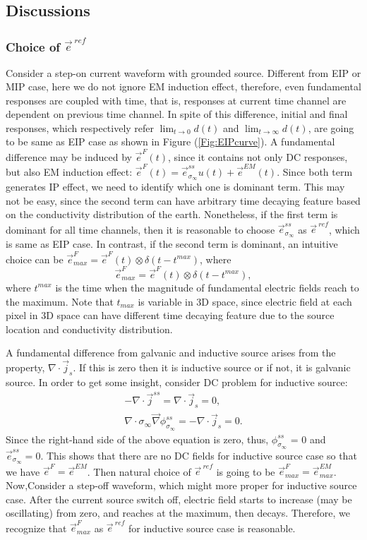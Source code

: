 \documentclass[a4paper, 11pt]{article}
\renewcommand{\div}{\nabla\cdot}
\newcommand{\grad}{\vec \nabla}
\newcommand{\siginf}{\sigma_\infty}
\renewcommand {\j}  { {\vec j} }
\newcommand {\e}  { {\vec e} }
\begin{document}
\subsection{Discussions}

\subsubsection{Choice of $\e^{\ ref}$}
Consider a step-on current waveform with grounded source. Different from EIP or MIP case, here we do not ignore EM induction effect, therefore, even fundamental responses are coupled with time, that is, responses at current time channel are dependent on previous time channel. In spite of this difference, initial and final responses, which respectively refer $\lim_{t\rightarrow 0}d (t)$ and $\lim_{t\rightarrow \infty}d (t)$, are going to be same as EIP case as shown in Figure (\ref{Fig:EIPcurve}). A fundamental difference may be induced by $\e^F(t)$, since it contains not only DC responses, but also EM induction effect: $\e^F(t) = \e^{ss}_{\siginf}u(t)+\e^{EM}(t)$. Since both term generates IP effect, we need to identify which one is dominant term. This may not be easy, since the second term can have arbitrary time decaying feature based on the conductivity distribution of the earth. Nonetheless, if the first term is dominant for all time channels, then it is reasonable to choose $\e^{ss}_{\siginf}$ as $\e^{\ ref}$, which is same as EIP case. In contrast, if the second term is dominant, an intuitive choice can be $\e^{F}_{max} = \e^{F}(t) \otimes \delta(t-t^{max})$, where
\begin{equation}
  \e^{F}_{max} = \e^{F}(t) \otimes \delta(t-t^{max}),
\end{equation}
where $t^{max}$ is the time when the magnitude of fundamental electric fields reach to the maximum. Note that $t_{max}$ is variable in 3D space, since electric field at each pixel in 3D space can have different time decaying feature due to the source location and conductivity distribution.

A fundamental difference from galvanic and inductive source arises from the property, $\div\j_s$.  If this is zero then it is inductive source or if not, it is galvanic source. In order to get some insight, consider DC problem for inductive source:
\begin{eqnarray*}
    -\div\j^{ss} = \div\j_s = 0, \\
    \div \siginf \grad \phi^{ss}_{\siginf} = -\div\j_s = 0.
\end{eqnarray*}
Since the right-hand side of the above equation is zero, thus, $\phi^{ss}_{\siginf}$ = 0 and $\e^{ss}_{\siginf}=0$. This shows that there are no DC fields for inductive source case so that we have $\e^{F} = \e^{EM}$. Then natural choice of $\e^{\ ref}$ is going to be $\e^{F}_{max} = \e^{EM}_{max}$. Now,Consider a step-off waveform, which might more proper for inductive source case. After the current source switch off, electric field starts to increase (may be oscillating)
from zero, and reaches at the maximum, then decays. Therefore, we recognize that $\e^{F}_{max}$ as $\e^{\ ref}$ for inductive source case is reasonable.
\end{document}
